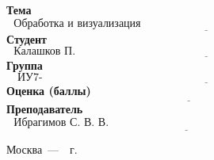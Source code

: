 \begin{titlepage}
	\noindent\textbf{Тема} $\underline{\text{~~Обработка и визуализация графов~~~~~~~~~~~~~~~~~~~~~~~~~~~~~~~~~~~~~~~~~~~~~~~~~~~~~~~~~~~~~~~~~~~}}$\newline\newline
	\noindent\textbf{Студент} $\underline{\text{~~Калашков П. А.~~~~~~~~~~~~~~~~~~~~~~~~~~~~~~~~~~~~~~~~~~~~~~~~~~~~~~~~~~~~~~~~~~~~~~~~~~~~~~~~~~~~~~~~}}$\newline\newline
	\noindent\textbf{Группа} $\underline{\text{~~~ИУ7-56Б~~~~~~~~~~~~~~~~~~~~~~~~~~~~~~~~~~~~~~~~~~~~~~~~~~~~~~~~~~~~~~~~~~~~~~~~~~~~~~~~~~~~~~~~~~~~~~~~~}}$\newline\newline
	\noindent\textbf{Оценка (баллы)} $\underline{\text{~~~~~~~~~~~~~~~~~~~~~~~~~~~~~~~~~~~~~~~~~~~~~~~~~~~~~~~~~~~~~~~~~~~~~~~~~~~~~~~~~~~~~~~~~~~~~~~~~~~}}$\newline\newline
	\noindent\textbf{Преподаватель} $\underline{\text{~~Ибрагимов С. В. В.~~~~~~~~~~~~~~~~~~~~~~~~~~~~~~~~~~~~~~~~~~~~~~~~~~~~~~~~~~~~~~~~~~~~~~}}$\newline
	
	\begin{center}
		\vfill
		Москва~---~\the\year~г.
	\end{center}
	\restoregeometry
\end{titlepage}

